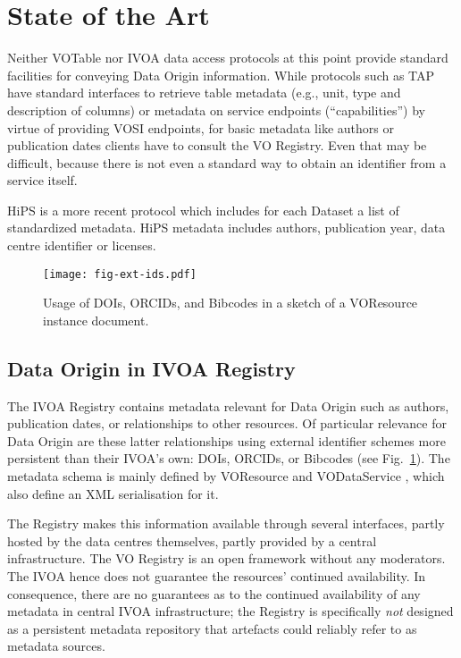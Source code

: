 \documentclass[11pt,a4paper]{ivoa}
\begin{document}
\section{State of the Art}

Neither VOTable \citep{2019ivoa.spec.1021O} nor IVOA data access protocols at this point provide standard facilities for conveying Data Origin information. While protocols such as TAP \citep{2019ivoa.spec.0927D} have standard interfaces to retrieve table metadata (e.g., unit, type and description of columns) or metadata on service endpoints (``capabilities'') by virtue of providing VOSI \citep{2017ivoa.spec.0524G} endpoints, for basic metadata like authors or publication dates clients have to consult the VO Registry.  Even that may be difficult, because there is not even a standard way to obtain an identifier from a service itself.

HiPS \citep{2017ivoa.spec.0519F} is a more recent protocol which includes for each Dataset a list of standardized metadata. HiPS metadata includes authors, publication year, data centre identifier or licenses.

\begin{figure}
\centering
\texttt{[image: fig-ext-ids.pdf]}
\caption{Usage of DOIs, ORCIDs, and Bibcodes in a sketch of a
VOResource instance document.}
\label{fig:extids}
\end{figure}

\subsection{Data Origin in IVOA Registry}
The IVOA Registry contains metadata relevant for Data Origin such as authors,
publication dates,
or relationships to other resources.  Of particular relevance for Data
Origin are these latter relationships using external identifier schemes
more persistent than their IVOA's own: DOIs, ORCIDs, or Bibcodes (see
Fig.~\ref{fig:extids}).  The  metadata schema is mainly defined by
VOResource \citep{2018ivoa.spec.0625P} and VODataService
\citep{2021ivoa.spec.1102D}, which also define an XML serialisation for it.

The Registry makes this information available through several interfaces, partly
hosted by the data centres themselves, partly provided by a central
infrastructure.
The VO Registry is an open framework without any moderators.
The IVOA hence does not guarantee the resources' continued availability.
In consequence, there are no guarantees as to the continued availability
of any metadata in central IVOA infrastructure; the Registry is
specifically \emph{not} designed as a persistent metadata repository
that artefacts could reliably refer to as metadata sources.
\end{document}
